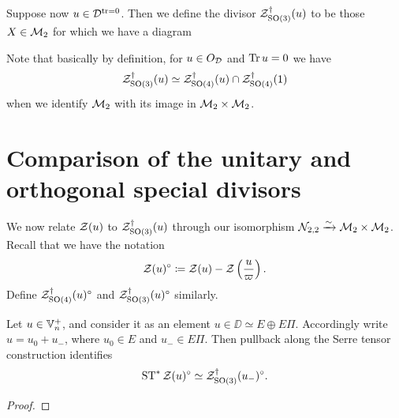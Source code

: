 \begin{definition}
  Suppose now $u \in \mathcal D^{\operatorname{tr} = 0}$.
  Then we define the divisor $\mathcal Z^{\dagger}_{\operatorname{SO}(3)}(u)$ to be those $X \in \mathcal M_2$
  for which we have a diagram
  \begin{center}
  \end{center}
  Note that basically by definition, for $u \in O_\mathcal D$ and $\operatorname{Tr} u = 0$ we have
  \[ \mathcal Z^{\dagger}_{\operatorname{SO}(3)}(u) \simeq \mathcal Z^{\dagger}_{\operatorname{SO}(4)}(u) \cap \mathcal Z^{\dagger}_{\operatorname{SO}(4)}(1) \]
  when we identify $\mathcal M_2$ with its image in $\mathcal M_2 \times \mathcal M_2$.
\end{definition}

\section{Comparison of the unitary and orthogonal special divisors}
We now relate $\mathcal Z(u)$ to $\mathcal Z^{\dagger}_{\operatorname{SO}(3)}(u)$ through our
isomorphism $\mathcal N_{2,2} \xrightarrow{\sim} \mathcal M_2 \times \mathcal M_2$.
Recall that we have the notation
\[ \mathcal Z(u)^\circ \coloneqq \mathcal Z(u) - \mathcal Z\left( \frac{u}{\varpi} \right). \]
Define $\mathcal Z^{\dagger}_{\operatorname{SO}(4)}(u)^\circ$ and $\mathcal Z^{\dagger}_{\operatorname{SO}(3)}(u)^\circ$ similarly.

\begin{lemma}
  Let $u \in \mathbb V_n^+$, and consider it as an element $u \in \DD \simeq E \oplus E \Pi$.
  Accordingly write $u = u_0 + u_-$, where $u_0 \in E$ and $u_- \in E \Pi$.
  Then pullback along the Serre tensor construction identifies
  \[ \operatorname{ST}^\ast \mathcal Z(u)^\circ \simeq \mathcal Z^{\dagger}_{\operatorname{SO}(3)}(u_-)^\circ. \]
\end{lemma}
\begin{proof}
\end{proof}


